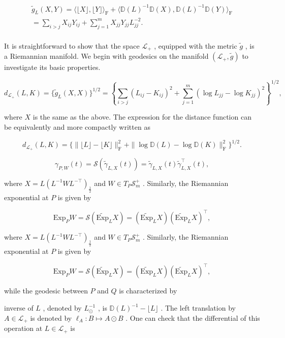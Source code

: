 \documentclass[11pt]{article}
\begin{document}
$$
\begin{array}{l} \tilde {g} _ {L} (X, Y) = \langle \lfloor X \rfloor , \lfloor Y \rfloor \rangle_ {\mathrm {F}} + \langle \mathbb {D} (L) ^ {- 1} \mathbb {D} (X), \mathbb {D} (L) ^ {- 1} \mathbb {D} (Y) \rangle_ {\mathrm {F}} \\ = \sum_ {i > j} X _ {i j} Y _ {i j} + \sum_ {j = 1} ^ {m} X _ {j j} Y _ {j j} L _ {j j} ^ {- 2}. \\ \end{array}
$$

It is straightforward to show that the space  $\mathcal{L}_{+}$ , equipped with the metric  $\tilde{g}$ , is a Riemannian manifold. We begin with geodesics on the manifold  $(\mathcal{L}_{+},\tilde{g})$  to investigate its basic properties.

$$
d _ {\mathcal {L} _ {+}} (L, K) = \{\tilde {g} _ {L} (X, X) \} ^ {1 / 2} = \left\{\sum_ {i > j} (L _ {i j} - K _ {i j}) ^ {2} + \sum_ {j = 1} ^ {m} (\log L _ {j j} - \log K _ {j j}) ^ {2} \right\} ^ {1 / 2},
$$

where  $X$  is the same as the above. The expression for the distance function can be equivalently and more compactly written as

$$
d _ {\mathcal {L} _ {+}} (L, K) = \{\| \lfloor L \rfloor - \lfloor K \rfloor \| _ {\mathrm {F}} ^ {2} + \| \log \mathbb {D} (L) - \log \mathbb {D} (K) \| _ {\mathrm {F}} ^ {2} \} ^ {1 / 2}.
$$

$$
\gamma_ {P, W} (t) = \mathcal {S} (\tilde {\gamma} _ {L, X} (t)) = \tilde {\gamma} _ {L, X} (t) \tilde {\gamma} _ {L, X} ^ {\top} (t),
$$

where  $X = L(L^{-1}WL^{-\top})_{\frac{1}{2}}$  and  $W \in T_P\mathcal{S}_m^+$ . Similarly, the Riemannian exponential at  $P$  is given by

$$
\mathrm {E x p} _ {P} W = \mathcal {S} (\widetilde {\mathrm {E x p}} _ {L} X) = (\widetilde {\mathrm {E x p}} _ {L} X) (\widetilde {\mathrm {E x p}} _ {L} X) ^ {\top},
$$

where  $X = L(L^{-1}WL^{-\top})_{\frac{1}{2}}$  and  $W \in T_P\mathcal{S}_m^+$ . Similarly, the Riemannian exponential at  $P$  is given by

$$
\mathrm {E x p} _ {P} W = \mathcal {S} (\widetilde {\mathrm {E x p}} _ {L} X) = (\widetilde {\mathrm {E x p}} _ {L} X) (\widetilde {\mathrm {E x p}} _ {L} X) ^ {\top},
$$

while the geodesic between  $P$  and  $Q$  is characterized by

inverse of  $L$ , denoted by  $L_{\odot}^{-1}$ , is  $\mathbb{D}(L)^{-1} - \lfloor L\rfloor$ . The left translation by  $A\in \mathcal{L}_{+}$  is denoted by  $\ell_A:B\mapsto A\odot B$ . One can check that the differential of this operation at  $L\in \mathcal{L}_{+}$  is
\end{document}
